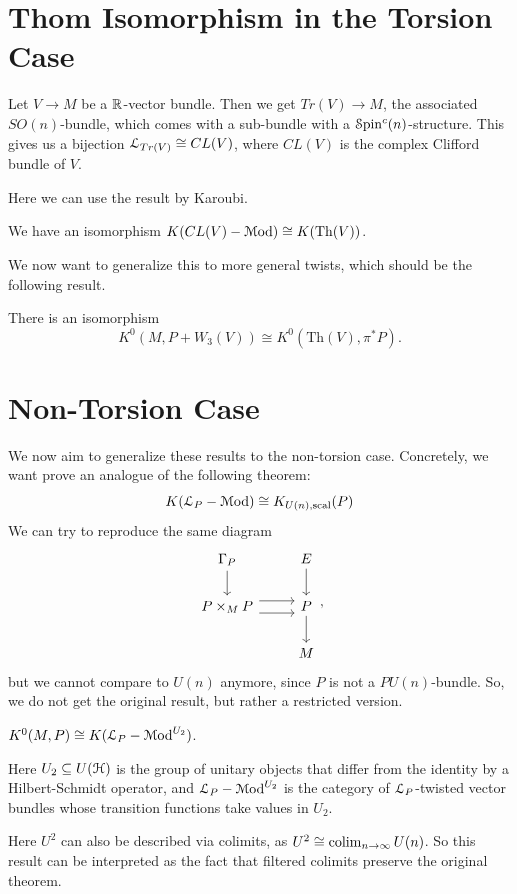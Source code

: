 \documentclass[10pt]{amsart}
\begin{document}
\section{Thom Isomorphism in the Torsion Case}
Let $V \to M$ be a $\mathbb{R}$-vector bundle. Then we get $Tr(V) \to M$,	the associated $SO(n)$-bundle, which comes with a sub-bundle with a $\mathcal{S}\mathrm{pin}^c(n)$-structure. This gives us a bijection $\mathcal{L}_{Tr(V)} \cong CL(V)$, where $CL(V)$ is the complex Clifford bundle of $V$.

Here we can use the result by Karoubi.

\begin{theorem}
	We have an isomorphism $K(CL(V)-\mathcal{M}\mathrm{od}) \cong K(\mathrm{Th}(V))$.
\end{theorem}

We now want to generalize this to more general	twists, which should be the following result.

\begin{theorem}
	There is an isomorphism
	\[K^0(M,P+W_3(V)) \cong K^0(\mathrm{Th}(V),\pi^*P). \]
\end{theorem}

\section{Non-Torsion Case}
We now aim to generalize these results to the non-torsion case. Concretely, we want prove an analogue of the following theorem:
\[K(\mathcal{L}_P-\mathcal{M}\mathrm{od}) \cong K_{U(n),\mathrm{scal}}(P) \]
We can try to reproduce the same diagram 
\[ 
	\begin{tikzcd}
	 \Gamma_P \arrow[d] & E \arrow[d] \\ 
	 P \times_M P \arrow[r, shift left = 1.8] \arrow[r, shift right = 1.8] & P \arrow[d] \\ 
	 & M  
	\end{tikzcd},
	\]
	but we cannot compare to $U(n)$ anymore, since $P$ is not a $PU(n)$-bundle. So, we do not get the original result, but rather a restricted version.

	\begin{theorem}
	 $K^0(M,P) \cong K(\mathcal{L}_P-\mathcal{M}\mathrm{od}^{U_2})$.
	\end{theorem}
	Here $U_2 \subseteq U(\mathcal{H})$	is the group of unitary objects that differ from the identity by a Hilbert-Schmidt operator, and $\mathcal{L}_P-\mathcal{M}\mathrm{od}^{U_2}$ is the category of $\mathcal{L}_P$-twisted vector bundles whose transition functions take values in $U_2$.

	Here $U^2$ can also be described via colimits, as $U^2 \cong \operatorname*{colim}_{n \to \infty} U(n)$. So this result can be interpreted as the fact that filtered colimits preserve the original theorem.
\end{document}
